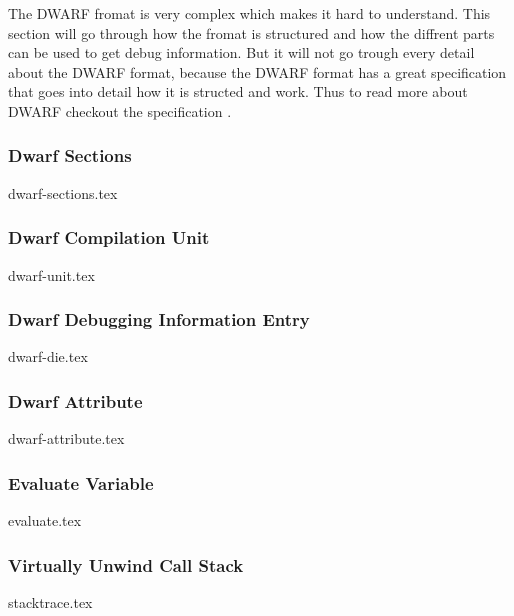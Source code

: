  


The \gls{DWARF} fromat is very complex which makes it hard to understand.
This section will go through how the fromat is structured and how the diffrent parts can be used to get debug information.
But it will not go trough every detail about the \gls{DWARF} format, because the \gls{DWARF} format has a great specification that goes into detail how it is structed and work.
Thus to read more about \gls{DWARF} checkout the specification \cite{dwarf}.


\subsubsection{Dwarf Sections}
{dwarf-sections.tex}


\subsubsection{Dwarf Compilation Unit}
{dwarf-unit.tex}


\subsubsection{Dwarf Debugging Information Entry}
{dwarf-die.tex}


\subsubsection{Dwarf Attribute}
{dwarf-attribute.tex}


\subsubsection{Evaluate Variable}
\label{sec:evaluate-variable}
{evaluate.tex}


\subsubsection{Virtually Unwind Call Stack}
{stacktrace.tex}

